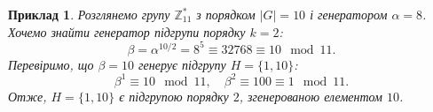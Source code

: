 \documentclass[12pt]{report}
\newtheorem{example}{Приклад}[chapter]
\begin{document}
\begin{example}
Розглянемо групу \( \mathbb{Z}^*_{11} \) з порядком \( |G| = 10 \) і генератором \( \alpha = 8 \). Хочемо знайти генератор підгрупи порядку \( k = 2 \):
\[
\beta = \alpha^{10/2} = 8^5 \equiv 32768 \equiv 10 \mod 11.
\]
Перевіримо, що \( \beta = 10 \) генерує підгрупу \( H = \{1, 10\} \):
\[
\beta^1 \equiv 10 \mod 11, \quad \beta^2 \equiv 100 \equiv 1 \mod 11.
\]
Отже, \( H = \{1, 10\} \) є підгрупою порядку \( 2 \), згенерованою елементом \( 10 \).
\end{example}
\end{document}
